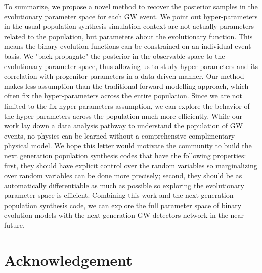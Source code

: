 \documentclass[twocolumn]{aastex631}
\begin{document}
To summarize, we propose a novel method to recover the posterior samples in the evolutionary parameter space for each GW event.
We point out hyper-parameters in the usual population synthesis simulation context are not actually parameters related to the population,
but parameters about the evolutionary function.
This means the binary evolution functions can be constrained on an individual event basis.
We "back propagate" the posterior in the observable space to the evolutionary parameter space,
thus allowing us to study hyper-parameters and its correlation with progenitor parameters in a data-driven manner.
Our method makes less assumption than the traditional forward modelling approach,
which often fix the hyper-parameters across the entire population.
Since we are not limited to the fix hyper-parameters assumption, we can explore the behavior of the hyper-parameters across the population much more efficiently.
While our work lay down a data analysis pathway to understand the population of GW events,
no physics can be learned without a comprehensive complimentary physical model.
We hope this letter would motivate the community to build the next generation population synthesis codes that have the following properties:
first, they should have explicit control over the random variables so marginalizing over random variables can be done more precisely;
second, they should be as automatically differentiable as much as possible so exploring the evolutionary parameter space is efficient.
Combining this work and the next generation population synthesis code,
we can explore the full parameter space of binary evolution models with the next-generation GW detectors network in the near future.





\section{Acknowledgement}


\end{document}
